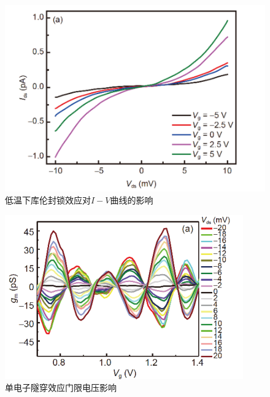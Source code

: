 \documentclass{beamer}[fontset=windows]
\begin{document}
    \begin{frame}
    \begin{figure}[H]
        \centering
        \hspace{2em}\includegraphics[width=.8\linewidth]{pic/5.png}
        \caption{低温下库伦封锁效应对$I-V$曲线的影响\cite{ali2020single}}
        \end{figure}
    \end{frame}
    \begin{frame}
        \begin{figure}[H]
            \centering
            \hspace{2em}\includegraphics[width=.8\linewidth]{pic/6.png}
            \caption{单电子隧穿效应门限电压影响\cite{ali2020single}}
            \end{figure}
        \end{frame}
\end{document}
